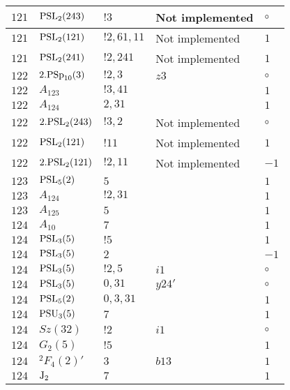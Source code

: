 \documentclass[a4paper, 11pt]{article}
\begin{document}
\begin{longtable}{lllll}
        $ 121 $ & $ {\rm PSL}_{2}(243) $ & $ !3 $ &  Not implemented &  $\circ$ \\ \hline
        $ 121 $ & $ {\rm PSL}_{2}(121) $ & $ !2, 61, 11 $ &  Not implemented & $ 1$ \\ \hline
        $ 121 $ & $ {\rm PSL}_{2}(241) $ & $ !2, 241 $ &  Not implemented & $ 1$ \\ \hline
        $ 122 $ & $ 2.{\rm PSp}_{10}(3) $ & $ ! 2,3 $ & $ z3 $ &  $\circ$ \\ \hline
        $ 122 $ & $ A_{123} $ & $ !3, 41 $ & $ ~ $ & $ 1$ \\ \hline
        $ 122 $ & $ A_{124} $ & $ 2, 31 $ & $ ~ $ & $ 1$ \\ \hline
        $ 122 $ & $ 2.{\rm PSL}_{2}(243) $ & $ !3, 2 $ &  Not implemented &  $\circ$ \\ \hline
        $ 122 $ & $ {\rm PSL}_{2}(121) $ & $ !11 $ &  Not implemented & $ 1$ \\ \hline
        $ 122 $ & $ 2.{\rm PSL}_{2}(121) $ & $ !2, 11 $ &  Not implemented & $ -1$ \\ \hline
        $ 123 $ & $ {\rm PSL}_{5}(2) $ & $ 5 $ & $ ~ $ & $ 1$ \\ \hline
        $ 123 $ & $ A_{124} $ & $ !2, 31 $ & $ ~ $ & $ 1$ \\ \hline
        $ 123 $ & $ A_{125} $ & $ 5 $ & $ ~ $ & $ 1$ \\ \hline
        $ 124 $ & $ A_{10} $ & $ 7 $ & $ ~ $ & $ 1$ \\ \hline
        $ 124 $ & $ {\rm PSL}_{3}(5) $ & $ ! 5 $ & $ ~ $ & $ 1$ \\ \hline
        $ 124 $ & $ {\rm PSL}_{3}(5) $ & $ 2 $ & $ ~ $ & $ -1$ \\ \hline
        $ 124 $ & $ {\rm PSL}_{3}(5) $ & $ ! 2,5 $ & $ i1 $ &  $\circ$ \\ \hline
        $ 124 $ & $ {\rm PSL}_{3}(5) $ & $ 0,31 $ & $ y24' $ &  $\circ$ \\ \hline
        $ 124 $ & $ {\rm PSL}_{5}(2) $ & $ 0, 3, 31 $ & $ ~ $ & $ 1$ \\ \hline
        $ 124 $ & $ {\rm PSU}_{3}(5) $ & $ 7 $ & $ ~ $ & $ 1$ \\ \hline
        $ 124 $ & $ Sz(32) $ & $ ! 2 $ & $ i1 $ &  $\circ$ \\ \hline
        $ 124 $ & $ G_{2}(5) $ & $ ! 5 $ & $ ~ $ & $ 1$ \\ \hline
        $ 124 $ & $ {}^{2}F_{4}(2)' $ & $ 3 $ & $ b13 $ & $ 1$ \\ \hline
        $ 124 $ & $ {\rm J}_2 $ & $ 7 $ & $ ~ $ & $ 1$ \\ \hline

\end{longtable}
\end{document}
